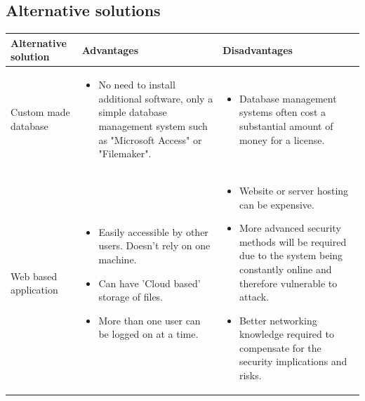 \subsection{Alternative solutions}

\begin{center}
    \begin{tabular}{|p{3cm}|p{6cm}|p{6cm}|}
        \hline
        \textbf{Alternative solution} & \textbf{Advantages} & \textbf{Disadvantages}\\ \hline
        Custom made database & \begin{itemize} \item No need to install additional software, only a simple database management system such as "Microsoft Access" or "Filemaker". \end{itemize} & \begin{itemize} \item Database management systems often cost a substantial amount of money for a license. \end{itemize}\\ \hline
        Web based application & \begin{itemize} \item Easily accessible by other users. Doesn't rely on one machine. \item Can have 'Cloud based' storage of files. \item More than one user can be logged on at a time. \end{itemize} & \begin{itemize} \item Website or server hosting can be expensive. \item More advanced security methods will be required due to the system being constantly online and therefore vulnerable to attack. \item Better networking knowledge required to compensate for the security implications and risks. \end{itemize}\\ \hline
    \end{tabular}
\end{center}

